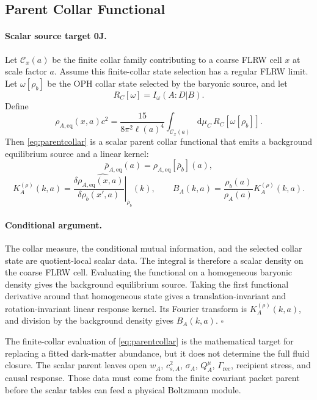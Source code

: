 \documentclass[11pt]{article}
\newcommand{\dd}{\mathrm{d}}
\begin{document}
\subsection{Parent Collar Functional}

\paragraph{Scalar source target 0J.}
Let \(\mathcal C_x(a)\) be the finite collar family contributing to a coarse
FLRW cell \(x\) at scale factor \(a\).  Assume this finite-collar state
selection has a regular FLRW limit.  Let \(\omega[\rho_b]\) be the OPH collar
state selected by the baryonic source, and let
\begin{equation}
  R_C[\omega]=I_\omega(A:D|B).
\end{equation}
Define
\begin{equation}
  \rho_{A,\mathrm{eq}}(x,a)c^2
  =
  \frac{15}{8\pi^2\ell(a)^4}
  \int_{\mathcal C_x(a)}\dd\mu_C\,
  R_C[\omega[\rho_b]].
  \label{eq:parentcollar}
\end{equation}
Then \eqref{eq:parentcollar} is a scalar parent collar functional that emits a
background equilibrium source and a linear kernel:
\begin{equation}
  \bar\rho_{A,\mathrm{eq}}(a)=
  \rho_{A,\mathrm{eq}}[\bar\rho_b](a),
\end{equation}
\begin{equation}
  K_A^{(\rho)}(k,a)=
  \widehat{
  \left.
  \frac{\delta\rho_{A,\mathrm{eq}}(x,a)}
       {\delta\rho_b(x',a)}
  \right|_{\bar\rho_b}
  }(k),
  \qquad
  B_A(k,a)=\frac{\rho_b(a)}{\rho_A(a)}K_A^{(\rho)}(k,a).
\end{equation}

\paragraph{Conditional argument.}
The collar measure, the conditional mutual information, and the selected
collar state are quotient-local scalar data.  The integral is therefore a
scalar density on the coarse FLRW cell.  Evaluating the functional on a
homogeneous baryonic density gives the background equilibrium source.  Taking
the first functional derivative around that homogeneous state gives a
translation-invariant and rotation-invariant linear response kernel.  Its
Fourier transform is \(K_A^{(\rho)}(k,a)\), and division by the background density gives
\(B_A(k,a)\). \(\square\)

The finite-collar evaluation of \eqref{eq:parentcollar} is the mathematical
target for replacing a fitted dark-matter abundance, but it does not determine
the full fluid closure.  The scalar parent leaves open \(w_A\), \(c_{s,A}^2\),
\(\sigma_A\), \(Q_A^\mu\), \(\Gamma_{\mathrm{rec}}\), recipient stress, and
causal response.  Those data must come from the finite covariant packet parent
before the scalar tables can feed a physical Boltzmann module.
\end{document}
